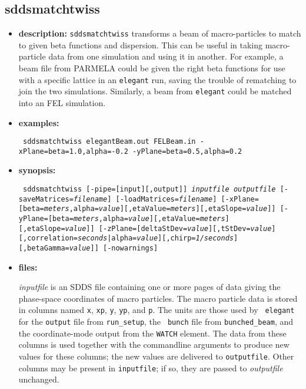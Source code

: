 \documentclass[11pt]{article}
\begin{document}
\subsection{sddsmatchtwiss}
\label{sddsmatchtwiss}

\begin{itemize}
\item {\bf description:} 
{\tt sddsmatchtwiss} transforms a beam of macro-particles to match to given beta
functions and dispersion.   This can be useful in taking macro-particle data from
one simulation and using it in another.  For example, a beam file from PARMELA
could be given the right beta functions for use with a specific lattice in an
{\tt elegant} run, saving the trouble of rematching to join the two simulations.
Similarly, a beam from {\tt elegant} could be matched into an FEL simulation.

\item {\bf examples:}
\begin{flushleft}{\tt
sddsmatchtwiss elegantBeam.out FELBeam.in -xPlane=beta=1.0,alpha=-0.2 -yPlane=beta=0.5,alpha=0.2
}\end{flushleft}

\item {\bf synopsis:}
\begin{flushleft}{\tt
sddsmatchtwiss [-pipe=[input][,output]] {\em inputfile} {\em outputfile}
[-saveMatrices={\em filename}] [-loadMatrices={\em filename}]
[-xPlane=[beta={\em meters},alpha={\em value}][,etaValue={\em meters}][,etaSlope={\em value}]]
[-yPlane=[beta={\em meters},alpha={\em value}][,etaValue={\em meters}][,etaSlope={\em value}]]
[-zPlane=[deltaStDev={\em value}][,tStDev={\em value}]
\hspace*{4mm}[{,correlation={\em seconds}|alpha={\em value}}][,chirp={\em 1/seconds}][,betaGamma={\em value}]]
[-nowarnings]
}\end{flushleft}

\item {\bf files:}

{\em inputfile} is an SDDS file containing one or more pages of data
giving the phase-space coordinates of macro particles.  The macro
particle data is stored in columns named \verb|x|, \verb|xp|,
\verb|y|, \verb|yp|, and \verb|p|.  The units are those used by {\tt
elegant} for the {\tt output} file from {\tt run\_setup}, the {\tt
bunch} file from {\tt bunched\_beam}, and the coordinate-mode output
from the {\tt WATCH} element. The data from these columns is used
together with the commandline arguments to produce new values for
these columns; the new values are delivered to {\tt outputfile}.
Other columns may be present in {\tt inputfile}; if so, they are
passed to {\em outputfile} unchanged.


\end{itemize}
\end{document}
